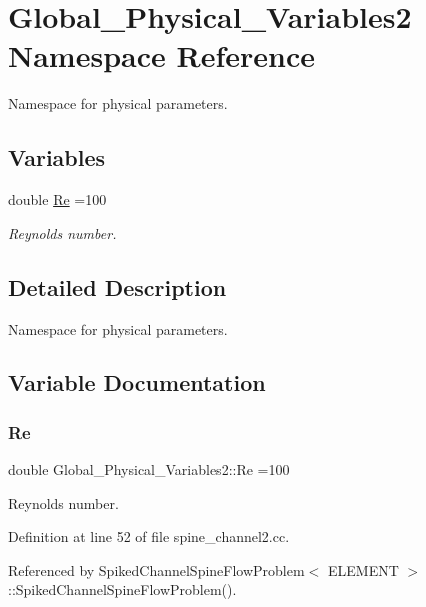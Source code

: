 \hypertarget{namespaceGlobal__Physical__Variables2}{}\section{Global\+\_\+\+Physical\+\_\+\+Variables2 Namespace Reference}
\label{namespaceGlobal__Physical__Variables2}


Namespace for physical parameters.  


\subsection*{Variables}
\begin{DoxyCompactItemize}
\item 
double \hyperlink{namespaceGlobal__Physical__Variables2_afce617c1bd6726b29fa0e1f7c892a955}{Re} =100
\begin{DoxyCompactList}\small\item\em Reynolds number. \end{DoxyCompactList}\end{DoxyCompactItemize}


\subsection{Detailed Description}
Namespace for physical parameters. 

\subsection{Variable Documentation}
\mbox{\label{namespaceGlobal__Physical__Variables2_afce617c1bd6726b29fa0e1f7c892a955}} 
\subsubsection{\texorpdfstring{Re}{Re}}
{\footnotesize\ttfamily double Global\+\_\+\+Physical\+\_\+\+Variables2\+::\+Re =100}



Reynolds number. 



Definition at line 52 of file spine\+\_\+channel2.\+cc.



Referenced by Spiked\+Channel\+Spine\+Flow\+Problem$<$ E\+L\+E\+M\+E\+N\+T $>$\+::\+Spiked\+Channel\+Spine\+Flow\+Problem().

